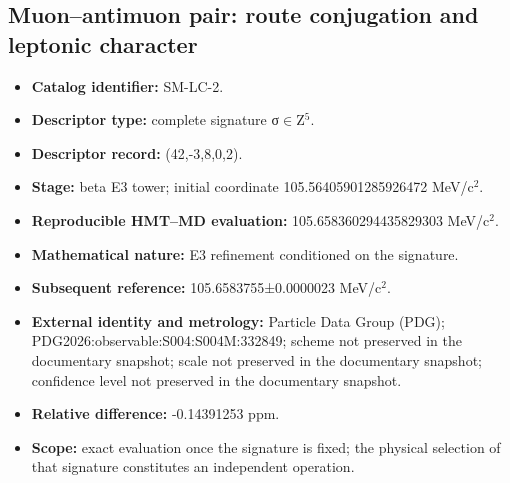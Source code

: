 \subsection{Muon–antimuon pair: route conjugation and leptonic character}
\begin{itemize}
\item \textbf{Catalog identifier:} SM-LC-2.
\item \textbf{Descriptor type:} complete signature σ\(\in\)Z\({}^{5}\).
\item \textbf{Descriptor record:} (42,-3,8,0,2).
\item \textbf{Stage:} beta E3 tower; initial coordinate 105.564059\allowbreak{}012859\allowbreak{}26472 MeV/c\({}^{2}\).
\item \textbf{Reproducible HMT--MD evaluation:} 105.658360\allowbreak{}294435\allowbreak{}829303 MeV/c\({}^{2}\).
\item \textbf{Mathematical nature:} E3 refinement conditioned on the signature.
\item \textbf{Subsequent reference:} 105.658375\allowbreak{}5±\allowbreak{}0.000002\allowbreak{}3 MeV/c\({}^{2}\).
\item \textbf{External identity and metrology:} Particle Data Group (PDG); PDG2026:\allowbreak{}observable:\allowbreak{}S004:\allowbreak{}S004M:\allowbreak{}332849; scheme not preserved in the documentary snapshot; scale not preserved in the documentary snapshot; confidence level not preserved in the documentary snapshot.
\item \textbf{Relative difference:} -0.143912\allowbreak{}53 ppm.
\item \textbf{Scope:} exact evaluation once the signature is fixed; the physical selection of that signature constitutes an independent operation.
\end{itemize}
